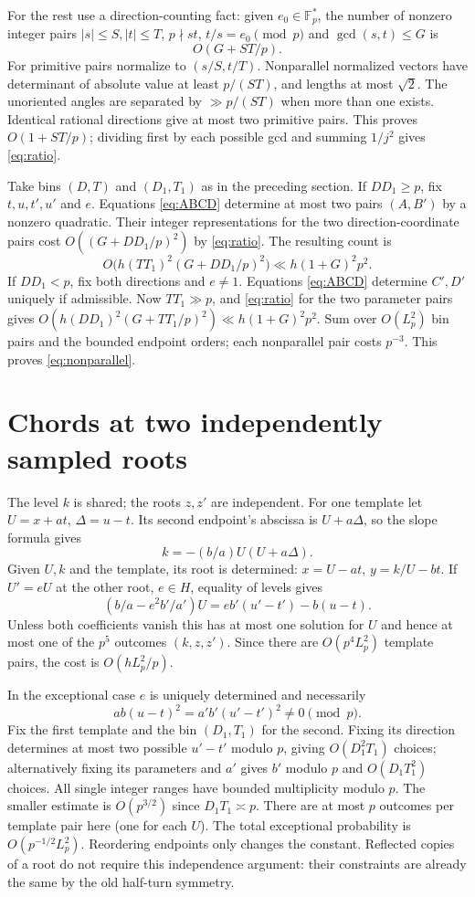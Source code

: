 \documentclass[11pt]{article}
\newcommand{\F}{\mathbb F_p}\newcommand{\G}{\mathcal G}\newcommand{\D}{\mathcal D}\newcommand{\R}{\mathcal R}\newcommand{\Z}{\mathbb Z}\newcommand{\htf}{F_{\mathrm{ht}}}\newcommand{\norm}[1]{\lVert#1\rVert_\infty}\newcommand{\Prob}{\mathbb P}\newcommand{\ch}{\chi}\newcommand{\TT}{\mathcal T}
\begin{document}
For the rest use a direction-counting fact: given $e_0\in\F^*$, the number of nonzero integer pairs $|s|\le S, |t|\le T$, $p\nmid st$, $t/s=e_0\pmod p$ and $\gcd(s,t)\le G$ is
\begin{equation}\label{eq:ratio}
 O(G+ST/p).
\end{equation}
For primitive pairs normalize to $(s/S,t/T)$. Nonparallel normalized vectors have determinant of absolute value at least $p/(ST)$, and lengths at most $\sqrt2$. The unoriented angles are separated by $\gg p/(ST)$ when more than one exists. Identical rational directions give at most two primitive pairs. This proves $O(1+ST/p)$; dividing first by each possible gcd and summing $1/j^2$ gives \eqref{eq:ratio}.

Take bins $(D,T)$ and $(D_1,T_1)$ as in the preceding section. If $DD_1\ge p$, fix $t,u,t',u'$ and $e$. Equations \eqref{eq:ABCD} determine at most two pairs $(A,B')$ by a nonzero quadratic. Their integer representations for the two direction-coordinate pairs cost $O((G+DD_1/p)^2)$ by \eqref{eq:ratio}. The resulting count is
\[
 O\big(h(TT_1)^2(G+DD_1/p)^2\big)\ll h(1+G)^2p^2.
\]
If $DD_1<p$, fix both directions and $e\ne1$. Equations \eqref{eq:ABCD} determine $C',D'$ uniquely if admissible. Now $TT_1\gg p$, and \eqref{eq:ratio} for the two parameter pairs gives $O(h(DD_1)^2(G+TT_1/p)^2)\ll h(1+G)^2p^2$. Sum over $O(L_p^2)$ bin pairs and the bounded endpoint orders; each nonparallel pair costs $p^{-3}$. This proves \eqref{eq:nonparallel}.

\section{Chords at two independently sampled roots}
The level $k$ is shared; the roots $z,z'$ are independent. For one template let $U=x+at$, $\Delta=u-t$. Its second endpoint's abscissa is $U+a\Delta$, so the slope formula gives
\[
 k=-(b/a)U(U+a\Delta).
\]
Given $U,k$ and the template, its root is determined: $x=U-at$, $y=k/U-bt$. If $U'=eU$ at the other root, $e\in H$, equality of levels gives
\[
 (b/a-e^2 b'/a')U=e b'(u'-t')-b(u-t).
\]
Unless both coefficients vanish this has at most one solution for $U$ and hence at most one of the $p^5$ outcomes $(k,z,z')$. Since there are $O(p^4 L_p^2)$ template pairs, the cost is $O(hL_p^2/p)$.

In the exceptional case $e$ is uniquely determined and necessarily
\[
 ab(u-t)^2=a'b'(u'-t')^2\ne0\pmod p.
\]
Fix the first template and the bin $(D_1,T_1)$ for the second. Fixing its direction determines at most two possible $u'-t'$ modulo $p$, giving $O(D_1^2T_1)$ choices; alternatively fixing its parameters and $a'$ gives $b'$ modulo $p$ and $O(D_1T_1^2)$ choices. All single integer ranges have bounded multiplicity modulo $p$. The smaller estimate is $O(p^{3/2})$ since $D_1T_1\asymp p$. There are at most $p$ outcomes per template pair here (one for each $U$). The total exceptional probability is $O(p^{-1/2}L_p^2)$. Reordering endpoints only changes the constant. Reflected copies of a root do not require this independence argument: their constraints are already the same by the old half-turn symmetry.
\end{document}
